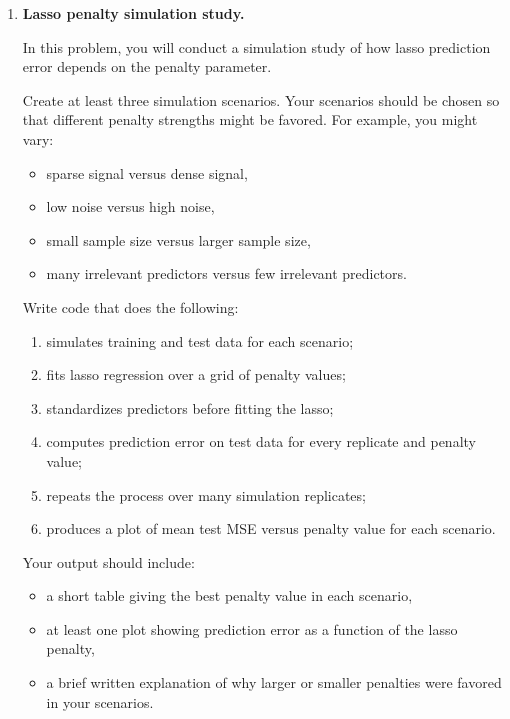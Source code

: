 \documentclass[11pt]{article}
\begin{document}
\begin{enumerate}
Demonstrate your function on simulated data. Briefly explain which method was selected and what the tuning parameter means. Your explanation should mention the bias-variance tradeoff and why cross-validation is being used instead of training MSE.

\newpage

\item \textbf{Lasso penalty simulation study.}

In this problem, you will conduct a simulation study of how lasso prediction error depends on the penalty parameter.

Create at least three simulation scenarios. Your scenarios should be chosen so that different penalty strengths might be favored. For example, you might vary:

\begin{itemize}
    \item sparse signal versus dense signal,
    \item low noise versus high noise,
    \item small sample size versus larger sample size,
    \item many irrelevant predictors versus few irrelevant predictors.
\end{itemize}

Write code that does the following:

\begin{enumerate}[label=(\alph*)]
    \item simulates training and test data for each scenario;
    \item fits lasso regression over a grid of penalty values;
    \item standardizes predictors before fitting the lasso;
    \item computes prediction error on test data for every replicate and penalty value;
    \item repeats the process over many simulation replicates;
    \item produces a plot of mean test MSE versus penalty value for each scenario.
\end{enumerate}

Your output should include:

\begin{itemize}
    \item a short table giving the best penalty value in each scenario,
    \item at least one plot showing prediction error as a function of the lasso penalty,
    \item a brief written explanation of why larger or smaller penalties were favored in your scenarios.
\end{itemize}


\end{enumerate}
\end{document}
